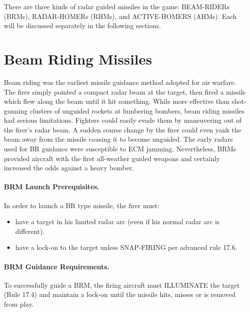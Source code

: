 
\label{rule:radar-guided-missiles}

There are three kinds of radar guided missiles in the game: BEAM-RIDERs (BRMs), RADAR-HOMERs (RHMs), and ACTIVE-HOMERS (AHMs). Each will be discussed separately in the following sections.

\section{Beam Riding Missiles}
\label{rule:beam-riding-missiles}

Beam riding was the earliest missile guidance method adopted for air warfare. The firer simply pointed a compact radar beam at the target, then fired a missile which flew along the beam until it hit something. While more effective than shot-gunning clusters of unguided rockets at lumbering bombers, beam riding missiles had serious limitations. Fighters could easily evade them by maneuvering out of the firer's radar beam. A sudden course change by the firer could even yank the beam away from the missile causing it to become unguided. The early radars used for BR guidance were susceptible to ECM jamming. Nevertheless, BRMs provided aircraft with the first all-weather guided weapons and certainly increased the odds against a heavy bomber.

\paragraph{BRM Launch Prerequisites.}\label{rule:brm-launch-requirements} In order to launch a BR type missile, the firer must:

\begin{itemize}

    \item have a target in his limited radar arc (even if his normal radar arc is different).

    \item have a lock-on to the target unless SNAP-FIRING per advanced rule 17.6.

\end{itemize}

\paragraph{BRM Guidance Requirements.} To successfully guide a BRM, the firing aircraft must ILLUMINATE the target (Rule 17.4) and maintain a lock-on until the missile hits, misses or is removed from play.

